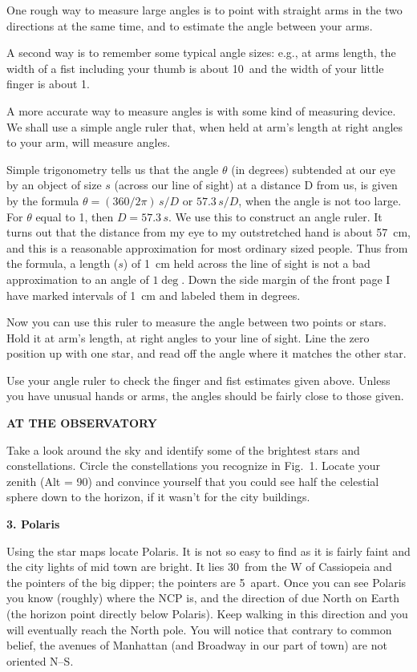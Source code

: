 One rough way to measure large angles is to point with straight arms
in the two directions at the same time, and to estimate the angle
between your arms.

A second way is to remember some typical angle sizes: e.g.,  at
arms length, the width of a fist including your thumb is about 10\deg\
and the width of your little finger is about 1\deg.

A more accurate way to measure angles is with some kind of measuring
device. We shall use a simple angle ruler that, when held at arm's
length at right angles to your arm, will measure angles.

Simple trigonometry tells us that the angle $\theta$ (in degrees)
subtended at our eye by an object of size $s$ (across our line of
sight) at a distance D from us, is given by the formula $\theta =
(360/2\pi)\,s/D$ or $57.3\, s/D$, when the angle is not too large.
For $\theta$ equal to 1\deg, then $D = 57.3\, s$.  We use this to
construct an angle ruler.  It turns out that the distance from my eye
to my outstretched hand is about 57~cm, and this is a reasonable approximation
for most ordinary sized people. Thus from the formula, a length ($s$) of
1~cm held across the line of sight is not a bad approximation to an
angle of $1\deg$.  Down the side margin of the front page I have
marked intervals of 1~cm and labeled them in degrees.

Now you can use this ruler to measure the angle between two points or
stars. Hold it at arm's length, at right angles to your line of
sight. Line the zero position up with one star, and read off the angle
where it matches the other star.

Use your angle ruler to check the finger and fist estimates given
above. Unless you have unusual hands or arms, the angles should be
fairly close to those given.

\medskip
\bigskip\noindent
{\bf AT THE OBSERVATORY}
\bigskip


\noindent 
Take a look around the sky and identify some of the brightest stars
and constellations. Circle the constellations you recognize in
Fig.~1. 
Locate your zenith (Alt = 90\deg) and convince yourself that you
could see half the celestial sphere down to the horizon, if it wasn't
for the city buildings.

\bigskip\noindent
{\bf 3. Polaris}

\bigskip\noindent
Using the star maps locate Polaris. It is not so easy to find as it is
fairly faint and the city lights of mid town are bright. It lies
30\deg\ from the W of Cassiopeia and the pointers of the big dipper;
the pointers are 5\deg\ apart.  Once you can see Polaris you know
(roughly) where the NCP is, and the direction of due North on Earth
(the horizon point directly below Polaris). Keep walking in this
direction and you will eventually reach the North pole. You will
notice that contrary to common belief, the avenues of Manhattan (and
Broadway in our part of town) are not oriented N--S.
 
